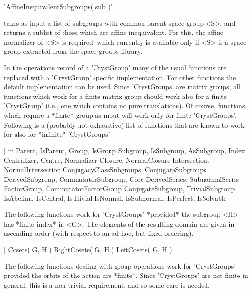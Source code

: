 
'AffineInequivalentSubgroups( sub )'

takes as input a  list of subgroups with common  parent space  group <S>,
and returns  a sublist of those  which are affine inequivalent. For this,
the affine  normalizer of <S> is required,  which currently  is available
only if <S> is a space group extracted from the space groups library.

%

In the operations  record  of  a  'CrystGroup' many of  the  usual {\GAP}
functions are replaced with a 'CrystGroup'  specific implementation.  For
other  functions   the default   implementation   can  be  used.    Since
'CrystGroups' are  matrix groups, all functions  which  work for a finite
matrix group should work also for a finite  'CrystGroup' (i.e., one which
contains no pure translations).  Of  course,  functions which require   a
*finite*   group as  input  will  work   only for finite   'CrystGroups'.
Following is a (probably not exhaustive) list of functions that are known
to work for also for *infinite* 'CrystGroups'.

|
     in
     Parent, IsParent, Group, IsGroup
     Subgroup, IsSubgroup, AsSubgroup, Index 
     Centralizer, Centre, Normalizer 
     Closure, NormalClosure
     Intersection, NormalIntersection
     ConjugacyClassSubgroups, ConjugateSubgroups
     DerivedSubgroup, CommutatorSubgroup, Core 
     DerivedSeries, SubnormalSeries
     FactorGroup, CommutatorFactorGroup
     ConjugateSubgroup, TrivialSubgroup 
     IsAbelian, IsCentral, IsTrivial
     IsNormal, IsSubnormal, IsPerfect, IsSolvable 
|


The following functions work for   'CrystGroups' *provided* the  subgroup
<H> has *finite index* in <G>.  The elements  of the resulting domain are
given in ascending order (with respect to an ad hoc, but fixed ordering).

|
     Cosets( G, H )
     RightCosets( G, H )
     LeftCosets( G, H )
|

The   following  functions    dealing  with group   operations  work  for
'CrystGroups'  provided  the orbits of the   action  are *finite*.  Since
'CrystGroups'  are   not  finite   in general,  this  is    a non-trivial
requirement, and so some care is needed.

